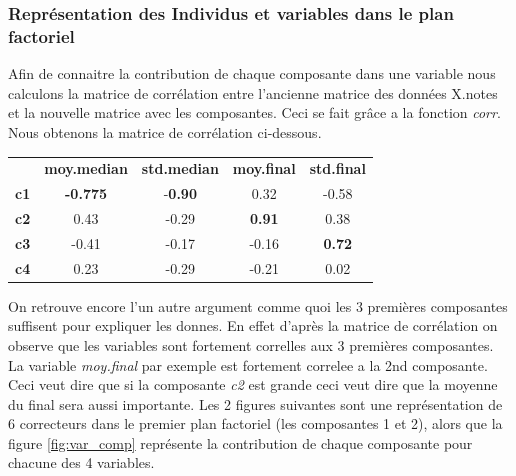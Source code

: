 \documentclass[10pt]{article}
\begin{document}
	\subsubsection{Représentation des Individus  et variables dans le plan factoriel}
	Afin de connaitre la contribution de chaque composante dans une variable nous calculons la matrice de corrélation entre l'ancienne matrice des données X.notes et la nouvelle matrice avec les composantes. Ceci se fait grâce a la fonction \textit{corr}. Nous obtenons la matrice de corrélation ci-dessous.\\
	\begin{center}
		\begin{tabular}{c c c c c}
			&	\textbf{moy.median}	&	 \textbf{std.median} &		\textbf{moy.final}	&	\textbf{ std.final}\\
			\textbf{c1}	&	\textbf{-0.775} &		-\textbf{0.90}	&	0.32	&	-0.58\\
			\textbf{c2}	&	0.43 &		-0.29	&\textbf{	0.91}	&	0.38\\
			\textbf{c3}	&	-0.41	&	-0.17	&	-0.16	&	\textbf{0.72}\\
			\textbf{c4}	&	0.23 &		-0.29 &		-0.21	&	0.02
		\end{tabular}
	\end{center}
	On retrouve encore l'un autre argument comme quoi les 3 premières composantes suffisent pour expliquer les donnes. En effet d'après la matrice de corrélation on observe que les variables sont fortement correlles aux 3 premières composantes. La variable \textit{moy.final} par exemple est fortement correlee a la 2nd composante. Ceci veut dire que si la composante \textit{c2} est grande ceci veut dire que la moyenne du final sera aussi importante. Les 2 figures suivantes sont une représentation de 6 correcteurs dans le premier plan factoriel (les composantes 1 et 2), alors que la figure \ref{fig:var_comp} représente la contribution de chaque composante pour chacune des 4 variables.
	
\end{document}
